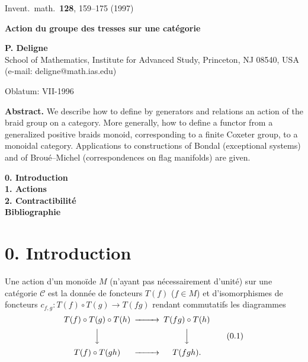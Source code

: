 \documentclass[11pt,a4paper]{article}
\theoremstyle{plain}
\theoremstyle{definition}
\newcommand{\cC}{\mathscr{C}}
\begin{document}
\begin{center}
{\small Invent.\ math.\ \textbf{128}, 159--175 (1997)}
\end{center}

\vspace{0.5cm}

\begin{center}
{\LARGE\bfseries Action du groupe des tresses sur une cat\'egorie}
\end{center}

\vspace{0.3cm}

\begin{center}
\textbf{P. Deligne}\\[0.2cm]
School of Mathematics, Institute for Advanced Study, Princeton, NJ 08540, USA\\
(e-mail: deligne@math.ias.edu)
\end{center}

\vspace{0.2cm}

\noindent Oblatum: VII-1996

\vspace{0.3cm}

\noindent\textbf{Abstract.} We describe how to define by generators and relations an action of the braid group on a category. More generally, how to define a functor from a generalized positive braids monoid, corresponding to a finite Coxeter group, to a monoidal category. Applications to constructions of Bondal (exceptional systems) and of Brou\'e--Michel (correspondences on flag manifolds) are given.

\vspace{0.5cm}

\noindent\textbf{0. Introduction} \\
\textbf{1. Actions} \\
\textbf{2. Contractibilit\'e} \\
\textbf{Bibliographie} 

\vspace{0.5cm}

\section*{0. Introduction}

Une action d'un mono\"ide $M$ (n'ayant pas n\'ecessairement d'unit\'e) sur une cat\'egorie $\cC$ est la donn\'ee de foncteurs $T(f)$ ($f \in M$) et d'isomorphismes de foncteurs $c_{f,g} : T(f) \circ T(g) \to T(fg)$ rendant commutatifs les diagrammes
\begin{equation}\label{eq:0.1}
\begin{CD}
T(f) \circ T(g) \circ T(h) @>>> T(fg) \circ T(h) \\
@VVV @VVV \\
T(f) \circ T(gh) @>>> T(fgh).
\end{CD}
\tag{0.1}
\end{equation}
\end{document}
